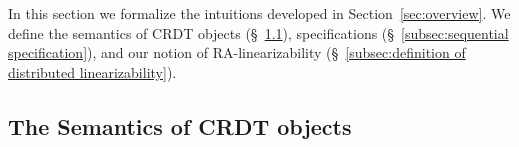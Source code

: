 \section{\CRDTLin{}}
\label{sec:distributed-lin}


In this section we formalize the intuitions developed in Section~\ref{sec:overview}. We define the semantics of CRDT objects (\S~\ref{ssec:semantics}), specifications (\S~\ref{subsec:sequential specification}), and our notion of RA-linearizability (\S~\ref{subsec:definition of distributed linearizability}).



\subsection{The Semantics of CRDT objects}\label{ssec:semantics}

